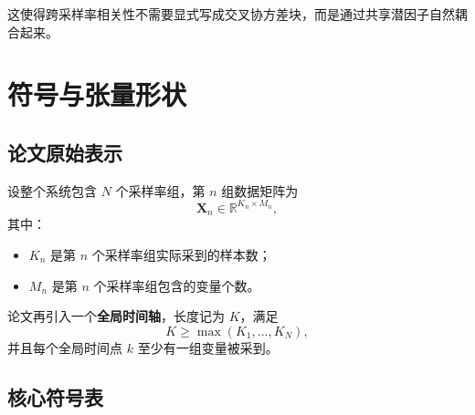 \documentclass[UTF8]{ctexart}
\begin{document}
这使得跨采样率相关性不需要显式写成交叉协方差块，而是通过共享潜因子自然耦合起来。

\section{符号与张量形状}

\subsection{论文原始表示}

设整个系统包含 $N$ 个采样率组，第 $n$ 组数据矩阵为
\begin{equation}
    \bm{X}_n \in \mathbb{R}^{K_n \times M_n},
\end{equation}
其中：
\begin{itemize}
    \item $K_n$ 是第 $n$ 个采样率组实际采到的样本数；
    \item $M_n$ 是第 $n$ 个采样率组包含的变量个数。
\end{itemize}

论文再引入一个\textbf{全局时间轴}，长度记为 $K$，满足
\begin{equation}
    K \ge \max(K_1,\dots,K_N),
\end{equation}
并且每个全局时间点 $k$ 至少有一组变量被采到。

\subsection{核心符号表}
\end{document}
